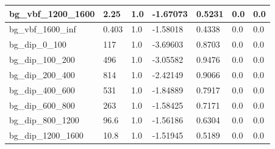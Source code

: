 \documentclass[a4paper, 10pt]{article}
\begin{document}
\begin{table}[H]
\begin{center}
\begin{tabular}{|m{23.0mm}|m{23.0mm}|m{18.0mm}|m{19.0mm}|m{19.0mm}|m{19.0mm}|m{19.0mm}|}
      \hline
      {\cellcolor{white}         bg\_vbf\_1200\_1600}& {\cellcolor{white}         2.25}& {\cellcolor{white}         1.0}& {\cellcolor{white}         -1.67073}& {\cellcolor{white}         0.5231}& {\cellcolor{green}         0.0}& {\cellcolor{green}         0.0}\\
      \hline
      {\cellcolor{white}         bg\_vbf\_1600\_inf}& {\cellcolor{white}         0.403}& {\cellcolor{white}         1.0}& {\cellcolor{white}         -1.58018}& {\cellcolor{white}         0.4338}& {\cellcolor{green}         0.0}& {\cellcolor{green}         0.0}\\
      \hline
      {\cellcolor{white}         bg\_dip\_0\_100}& {\cellcolor{white}         117}& {\cellcolor{white}         1.0}& {\cellcolor{white}         -3.69603}& {\cellcolor{white}         0.8703}& {\cellcolor{green}         0.0}& {\cellcolor{green}         0.0}\\
      \hline
      {\cellcolor{white}         bg\_dip\_100\_200}& {\cellcolor{white}         496}& {\cellcolor{white}         1.0}& {\cellcolor{white}         -3.05582}& {\cellcolor{white}         0.9476}& {\cellcolor{green}         0.0}& {\cellcolor{green}         0.0}\\
      \hline
      {\cellcolor{white}         bg\_dip\_200\_400}& {\cellcolor{white}         814}& {\cellcolor{white}         1.0}& {\cellcolor{white}         -2.42149}& {\cellcolor{white}         0.9066}& {\cellcolor{green}         0.0}& {\cellcolor{green}         0.0}\\
      \hline
      {\cellcolor{white}         bg\_dip\_400\_600}& {\cellcolor{white}         531}& {\cellcolor{white}         1.0}& {\cellcolor{white}         -1.84889}& {\cellcolor{white}         0.7917}& {\cellcolor{green}         0.0}& {\cellcolor{green}         0.0}\\
      \hline
      {\cellcolor{white}         bg\_dip\_600\_800}& {\cellcolor{white}         263}& {\cellcolor{white}         1.0}& {\cellcolor{white}         -1.58425}& {\cellcolor{white}         0.7171}& {\cellcolor{green}         0.0}& {\cellcolor{green}         0.0}\\
      \hline
      {\cellcolor{white}         bg\_dip\_800\_1200}& {\cellcolor{white}         96.6}& {\cellcolor{white}         1.0}& {\cellcolor{white}         -1.56186}& {\cellcolor{white}         0.6304}& {\cellcolor{green}         0.0}& {\cellcolor{green}         0.0}\\
      \hline
      {\cellcolor{white}         bg\_dip\_1200\_1600}& {\cellcolor{white}         10.8}& {\cellcolor{white}         1.0}& {\cellcolor{white}         -1.51945}& {\cellcolor{white}         0.5189}& {\cellcolor{green}         0.0}& {\cellcolor{green}         0.0}\\

\end{tabular}
\end{center}
\end{table}
\end{document}
